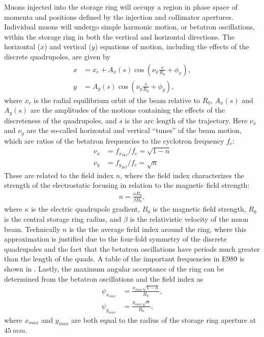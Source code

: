 Muons injected into the storage ring will occupy a region in phase space of momenta and positions defined by the injection and collimator apertures. Individual muons will undergo simple harmonic motion, or betatron oscillations, within the storage ring in both the vertical and horizontal directions. The horizontal ($x$) and vertical ($y$) equations of motion, including the effects of the discrete quadrupoles, are given by
        \begin{align} \label{eq:betatronmotion}
            x &= x_{e} + A_{x}(s) \cos(\nu_{x} \frac{s}{R_{0}} + \phi_{x}), \\
            y &= A_{y}(s) \cos(\nu_{y} \frac{s}{R_{0}} + \phi_{y}), 
        \end{align}
where $x_{e}$ is the radial equilibrium orbit of the beam relative to $R_{0}$, $A_{x}(s)$ and $A_{y}(s)$ are the amplitudes of the motions containing the effects of the discreteness of the quadrupoles, and $s$ is the arc length of the trajectory. Here $\nu_{x}$ and $\nu_{y}$ are the so-called horizontal and vertical ``tunes'' of the beam motion, which are ratios of the betatron frequencies to the cyclotron frequency $f_{c}$: 
        \begin{equation} \label{eq:tunes}
        \begin{aligned}
            \nu_{x} &= f_{x_{BO}}/f_{c} = \sqrt{1-n} \\
            \nu_{y} &= f_{y_{BO}}/f_{c} = \sqrt{n}
        \end{aligned}
        \end{equation}
These are related to the field index $n$, where the field index characterizes the strength of the electrostatic focusing in relation to the magnetic field strength: 
        \begin{align} \label{eq:fieldindex}
            n = \frac{\kappa R_{0}}{\beta B_{0}},
        \end{align}
where $\kappa$ is the electric quadrupole gradient, $B_{0}$ is the magnetic field strength, $R_{0}$ is the central storage ring radius, and $\beta$ is the relativistic velocity of the muon beam. Technically $n$ is the the average field index around the ring, where this approximation is justified due to the four-fold symmetry of the discrete quadrupoles and the fact that the betatron oscillations have periods much greater than the length of the quads. A table of the important frequencies in E989 is shown in . Lastly, the maximum angular acceptance of the ring can be determined from the betatron oscillations and the field index as 
        \begin{equation} \label{eq:maxangles}
        \begin{aligned}
            \psi_{x_{max}} &= \frac{x_{max}\sqrt{1-n}}{R_{0}}, \\
            \psi_{y_{max}} &= \frac{y_{max}\sqrt{n}}{R_{0}},
        \end{aligned}
        \end{equation}
where $x_{max}$ and $y_{max}$ are both equal to the radius of the storage ring aperture at $\SI{45}{mm}$.


